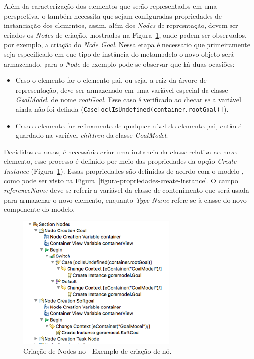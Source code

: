 Além da caracterização dos elementos que serão representados em uma perspectiva, o \sirius também necessita que sejam configuradas propriedades de instanciação dos elementos, assim, além dos \textit{Nodes} de represntação, devem ser criados os \textit{Nodes} de criação, mostrados na Figura~\ref{figura-criacao-node}, onde podem ser observados, por exemplo, a criação do \textit{Node Goal}. Nessa etapa é necessario que primeiramente seja especificado em que tipo de instância do metamodelo o novo objeto será armazenado, para o \textit{Node} de exemplo pode-se observar que há duas ocasiões:
\begin{itemize}
	\item Caso o elemento for o elemento pai, ou seja, a raiz da árvore de representação, deve ser armazenado em uma variável especial da classe \textit{GoalModel}, de nome \textit{rootGoal}. Esse caso é verificado ao checar se a variável ainda não foi definda (\texttt{Case[oclIsUndefined(container.rootGoal)]}).
	\item Caso o elemento for refinamento de qualquer nível do elemento pai, então é guardado na variável \textit{children} da classe \textit{GoalModel}.
\end{itemize}

Decididos os casos, é necessário criar uma instancia da classe relativa ao novo elemento, esse processo é definido por meio das propriedades da opção \textit{Create Instance} (Figura~\ref{figura-criacao-node}). Essas propriedades são definidas de acordo com o modelo \ecore, como pode ser visto na Figura~\ref{figura-propriedades-create-instance}. O campo \textit{referenceName} deve se referir a variável da classe de contenimento que será usada para armazenar o novo elemento, enquanto \textit{Type Name} refere-se à classe do novo componente do modelo.

\begin{figure}
	\centering
	\includegraphics[width=0.7\textwidth]{figuras/unagi/exemplo-criacao-nodes.png}
	\caption{Criação de Nodes no \sirius - Exemplo de criação de nó.}
	\label{figura-criacao-node}
\end{figure}

